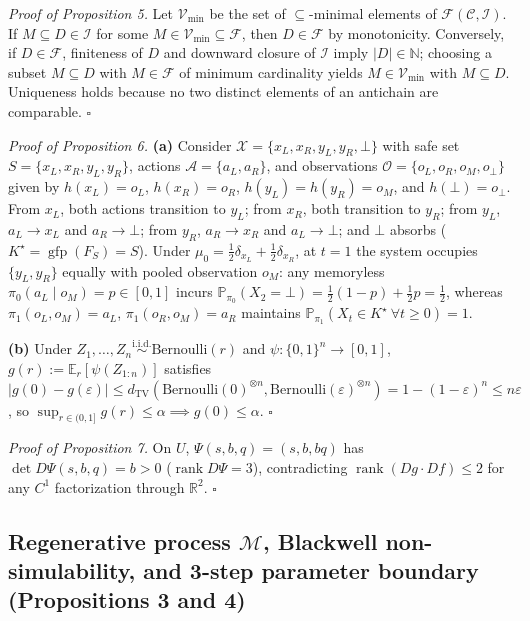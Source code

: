 \documentclass[11pt,letterpaper]{article}
\begin{document}
\emph{Proof of Proposition 5.} Let \(\mathcal{V}_{\min}\) be the set of
\(\subseteq\)-minimal elements of
\(\mathcal{F}(\mathcal{C}, \mathcal{I})\). If
\(M \subseteq D \in \mathcal{I}\) for some
\(M \in \mathcal{V}_{\min} \subseteq \mathcal{F}\), then
\(D \in \mathcal{F}\) by monotonicity. Conversely, if
\(D \in \mathcal{F}\), finiteness of \(D\) and downward closure of
\(\mathcal{I}\) imply \(|D| \in \mathbb{N}\); choosing a subset
\(M \subseteq D\) with \(M \in \mathcal{F}\) of minimum cardinality
yields \(M \in \mathcal{V}_{\min}\) with \(M \subseteq D\). Uniqueness
holds because no two distinct elements of an antichain are comparable.
\(\square\)

\emph{Proof of Proposition 6.} \textbf{(a)} Consider
\(\mathcal{X} = \{x_L, x_R, y_L, y_R, \bot\}\) with safe set
\(S = \{x_L, x_R, y_L, y_R\}\), actions \(\mathcal{A} = \{a_L, a_R\}\),
and observations \(\mathcal{O} = \{o_L, o_R, o_M, o_\bot\}\) given by
\(h(x_L) = o_L\), \(h(x_R) = o_R\), \(h(y_L) = h(y_R) = o_M\), and
\(h(\bot) = o_\bot\). From \(x_L\), both actions transition to \(y_L\);
from \(x_R\), both transition to \(y_R\); from \(y_L\), \(a_L \to x_L\)
and \(a_R \to \bot\); from \(y_R\), \(a_R \to x_R\) and
\(a_L \to \bot\); and \(\bot\) absorbs
(\(K^\star = \operatorname{gfp}(F_S) = S\)). Under
\(\mu_0 = \frac{1}{2}\delta_{x_L} + \frac{1}{2}\delta_{x_R}\), at
\(t=1\) the system occupies \(\{y_L, y_R\}\) equally with pooled
observation \(o_M\): any memoryless
\(\pi_0(a_L \mid o_M) = p \in [0,1]\) incurs
\(\mathbb{P}_{\pi_0}(X_2 = \bot) = \frac{1}{2}(1 - p) + \frac{1}{2} p = \frac{1}{2}\),
whereas \(\pi_1(o_L, o_M) = a_L\), \(\pi_1(o_R, o_M) = a_R\) maintains
\(\mathbb{P}_{\pi_1}(X_t \in K^\star\ \forall t \ge 0) = 1\).

\textbf{(b)} Under
\(Z_1, \dots, Z_n \stackrel{\mathrm{i.i.d.}}{\sim} \mathrm{Bernoulli}(r)\)
and \(\psi: \{0,1\}^n \to [0,1]\),
\(g(r) := \mathbb{E}_r[\psi(Z_{1:n})]\) satisfies
\(|g(0) - g(\varepsilon)| \le d_{\mathrm{TV}}(\mathrm{Bernoulli}(0)^{\otimes n}, \mathrm{Bernoulli}(\varepsilon)^{\otimes n}) = 1 - (1-\varepsilon)^n \le n\varepsilon\)
\citep{leCam1973, mayo2018}, so
\(\sup_{r \in (0,1]} g(r) \le \alpha \implies g(0) \le \alpha\).
\(\square\)

\emph{Proof of Proposition 7.} On \(U\), \(\Psi(s,b,q) = (s, b, bq)\)
has \(\det D\Psi(s,b,q) = b > 0\) (\(\operatorname{rank} D\Psi = 3\)),
contradicting \(\operatorname{rank}(Dg \cdot Df) \le 2\) for any \(C^1\)
factorization through \(\mathbb{R}^2\). \(\square\)

\subsection{\texorpdfstring{Regenerative process \(\mathcal{M}\),
Blackwell non-simulability, and 3-step parameter boundary (Propositions
3 and
4)}{Regenerative process \textbackslash mathcal\{M\}, Blackwell non-simulability, and 3-step parameter boundary (Propositions 3 and 4)}}\label{regenerative-process-mathcalm-blackwell-non-simulability-and-3-step-parameter-boundary-propositions-3-and-4}
\end{document}
